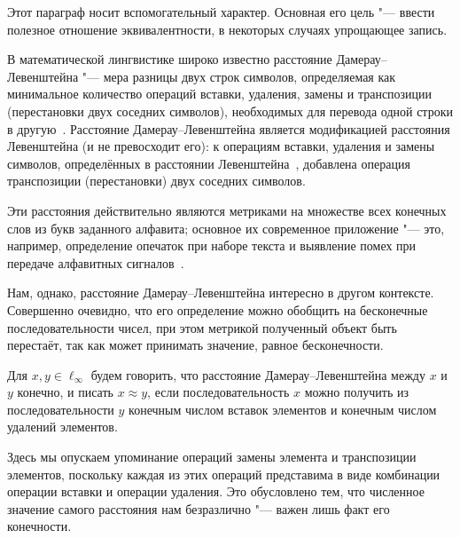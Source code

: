 Этот параграф носит вспомогательный характер.
Основная его цель "--- ввести полезное отношение эквивалентности,
в некоторых случаях упрощающее запись.

В математической лингвистике широко известно расстояние Дамерау--Левенштейна
"---
мера разницы двух строк символов, определяемая как минимальное количество операций вставки,
удаления, замены и транспозиции (перестановки двух соседних символов),
необходимых для перевода одной строки в другую~\cite{damerau1964technique,wagner1974string,gasfield2003strings}.
Расстояние Дамерау--Левенштейна является модификацией расстояния Левенштейна (и не превосходит его):
к операциям вставки, удаления и замены символов, определённых в расстоянии Левенштейна~\cite{levenstein1965binary},
добавлена операция транспозиции (перестановки) двух соседних символов.

Эти расстояния действительно являются метриками на множестве всех конечных слов из букв заданного алфавита;
основное их современное приложение "--- это, например, определение опечаток при наборе текста
и выявление помех при передаче алфавитных сигналов~\cite{oommen1997pattern,brill2000improved,bard2006spelling,li2006exploring}.


Нам, однако, расстояние Дамерау--Левенштейна интересно в другом контексте.
Совершенно очевидно, что его определение можно обобщить на бесконечные последовательности чисел,
при этом метрикой полученный объект быть перестаёт,
так как может принимать значение, равное бесконечности.

\begin{definition}
	\label{def:Damerau_Levenshein_distance}
	Для $x, y \in \ell_\infty$ будем говорить,
	что расстояние Дамерау--Левенштейна между $x$ и $y$ конечно,
	и писать $x\approx y$,
	если последовательность $x$ можно получить из последовательности $y$
	конечным числом вставок элементов и конечным числом удалений элементов.
\end{definition}

\begin{remark}
	Здесь мы опускаем упоминание операций замены элемента и транспозиции элементов,
	поскольку каждая из этих операций представима в виде комбинации операции вставки и операции удаления.
	Это обусловлено тем, что численное значение самого расстояния нам безразлично "---
	важен лишь факт его конечности.
\end{remark}


